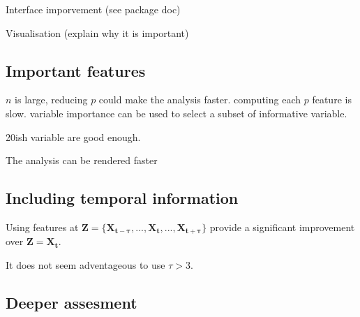 


Interface imporvement (see package doc)

Visualisation (explain why it is important)


\subsection{Important features}
$n$ is large, reducing $p$ could make the analysis faster. computing each $p$ feature is slow.
variable importance can be used to select a subset of informative variable.

20ish variable are good enough.

The analysis can be rendered faster
\subsection{Including temporal information}
Using features at $\mathbf{Z} = \{\mathbf{X_{t-\tau}}, ..., \mathbf{X_{t}}, ..., \mathbf{X_{t+\tau}}\}$ provide a significant improvement over $\mathbf{Z} = \mathbf{X_{t}}$.

It does not seem adventageous to use $\tau > 3$.
\subsection{Deeper assesment}
